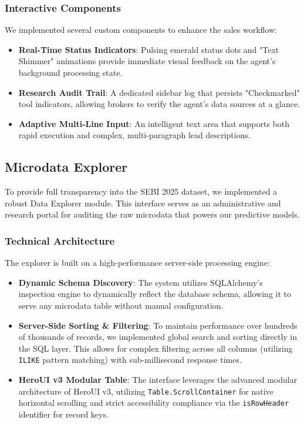 \documentclass[conference]{IEEEtran}
\begin{document}
\subsubsection{Interactive Components}
We implemented several custom components to enhance the sales workflow:
\begin{itemize}
    \item \textbf{Real-Time Status Indicators}: Pulsing emerald status dots and "Text Shimmer" animations provide immediate visual feedback on the agent's background processing state.
    \item \textbf{Research Audit Trail}: A dedicated sidebar log that persists "Checkmarked" tool indicators, allowing brokers to verify the agent's data sources at a glance.
    \item \textbf{Adaptive Multi-Line Input}: An intelligent text area that supports both rapid execution and complex, multi-paragraph lead descriptions.
\end{itemize}

\subsection{Microdata Explorer}
To provide full transparency into the SEBI 2025 dataset, we implemented a robust Data Explorer module. This interface serves as an administrative and research portal for auditing the raw microdata that powers our predictive models.

\subsubsection{Technical Architecture}
The explorer is built on a high-performance server-side processing engine:
\begin{itemize}
    \item \textbf{Dynamic Schema Discovery}: The system utilizes SQLAlchemy's inspection engine to dynamically reflect the database schema, allowing it to serve any microdata table without manual configuration.
    \item \textbf{Server-Side Sorting \& Filtering}: To maintain performance over hundreds of thousands of records, we implemented global search and sorting directly in the SQL layer. This allows for complex filtering across all columns (utilizing \texttt{ILIKE} pattern matching) with sub-millisecond response times.
    \item \textbf{HeroUI v3 Modular Table}: The interface leverages the advanced modular architecture of HeroUI v3, utilizing \texttt{Table.ScrollContainer} for native horizontal scrolling and strict accessibility compliance via the \texttt{isRowHeader} identifier for record keys.
\end{itemize}
\end{document}
